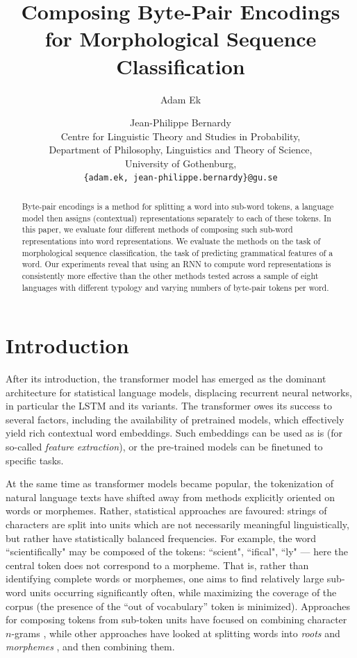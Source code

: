 \documentclass[11pt]{article}
\title{Composing Byte-Pair Encodings for Morphological Sequence Classification}
\author{Adam Ek \and Jean-Philippe Bernardy\\
	Centre for Linguistic Theory and Studies in Probability,\\
	Department of Philosophy, Linguistics and Theory of Science,\\
	University of Gothenburg,\\
	\texttt{\{adam.ek, jean-philippe.bernardy\}@gu.se}}
\date{}
\newcommand\citep{\cite}
\begin{document}
\maketitle
\begin{abstract}
          Byte-pair encodings is a method for splitting a word into
     sub-word tokens, a language model then assigns (contextual)
     representations separately to each of these tokens.  In this
     paper, we evaluate four different methods of composing such
     sub-word representations into word representations. We evaluate
     the methods on the task of morphological sequence classification,
     the task of predicting grammatical features of a word. Our
     experiments reveal that using an RNN to compute word
     representations is consistently more effective than the other
     methods tested across a sample of eight languages with different
     typology and varying numbers of byte-pair tokens per word.
\end{abstract}

	\section{Introduction}
	\label{intro}

            After its introduction, the transformer model
     \citep{vaswani2017attention} has emerged as the dominant
     architecture for statistical language models, displacing
     recurrent neural networks, in particular the LSTM and its
     variants. The transformer owes its success to several factors,
     including the availability of pretrained models, which
     effectively yield rich contextual word embeddings. Such
     embeddings can be used as is (for so-called \emph{feature extraction}),
     or the pre-trained models can be finetuned to specific
     tasks.

    	At the same time as transformer models became popular, the
     tokenization of natural language texts have shifted away from
     methods explicitly oriented on words or morphemes. Rather,
     statistical approaches are favoured: strings of
     characters are split into units which are not necessarily meaningful
     linguistically, but rather have statistically balanced
     frequencies. For example, the word ``scientifically" may be
     composed of the tokens: ``scient", ``ifical", ``ly" --- here the
     central token does not correspond to a morpheme.
             That is, rather than identifying complete words or
     morphemes, one aims to find relatively large sub-word units
     occurring significantly often, while maximizing the coverage of
     the corpus (the presence of the ``out of vocabulary'' token is
     minimized). Approaches for composing tokens from sub-token units
     have focused on combining character $n$-grams
     \citep{bojanowski2017enriching}, while other approaches have
     looked at splitting words into \textit{roots} and
     \textit{morphemes}
     \citep{el2012orthographic,chaudhary2018adapting,xu2017implicitly},
     and then combining them.
\end{document}
